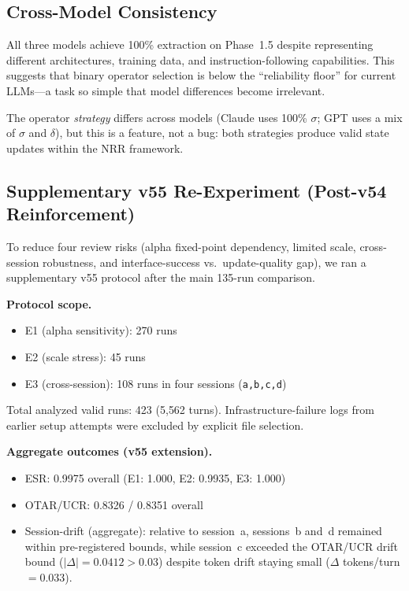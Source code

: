 \documentclass[11pt,a4paper]{article}
\begin{document}
\subsection{Cross-Model Consistency}

All three models achieve 100\% extraction on Phase~1.5 despite representing
different architectures, training data, and instruction-following capabilities.
This suggests that binary operator selection is below the ``reliability floor''
for current LLMs---a task so simple that model differences become irrelevant.

The operator \textit{strategy} differs across models (Claude uses 100\%
$\sigma$; GPT uses a mix of $\sigma$ and $\delta$), but this is a feature,
not a bug: both strategies produce valid state updates within the NRR framework.

\subsection{Supplementary v55 Re-Experiment (Post-v54 Reinforcement)}

To reduce four review risks (alpha fixed-point dependency, limited scale,
cross-session robustness, and interface-success vs.\ update-quality gap), we
ran a supplementary v55 protocol after the main 135-run comparison.

\textbf{Protocol scope.}
\begin{itemize}
    \item E1 (alpha sensitivity): 270 runs
    \item E2 (scale stress): 45 runs
    \item E3 (cross-session): 108 runs in four sessions (\texttt{a,b,c,d})
\end{itemize}
Total analyzed valid runs: 423 (5{,}562 turns). Infrastructure-failure logs
from earlier setup attempts were excluded by explicit file selection.

\textbf{Aggregate outcomes (v55 extension).}
\begin{itemize}
    \item ESR: 0.9975 overall (E1: 1.000, E2: 0.9935, E3: 1.000)
    \item OTAR/UCR: 0.8326 / 0.8351 overall
    \item Session-drift (aggregate): relative to session~a, sessions~b and~d
    remained within pre-registered bounds, while session~c exceeded the OTAR/UCR
    drift bound ($|\Delta|=0.0412 > 0.03$) despite token drift staying small
    ($\Delta$ tokens/turn $=0.033$).
\end{itemize}
\end{document}
